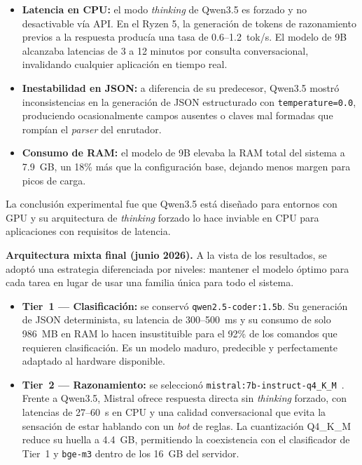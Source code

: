 \begin{itemize}
    \item \textbf{Latencia en CPU:} el modo \textit{thinking} de Qwen3.5 es forzado y no desactivable vía API. En el Ryzen 5, la generación de tokens de razonamiento previos a la respuesta producía una tasa de 0.6--1.2~tok/s. El modelo de 9B alcanzaba latencias de 3 a 12 minutos por consulta conversacional, invalidando cualquier aplicación en tiempo real.
    \item \textbf{Inestabilidad en JSON:} a diferencia de su predecesor, Qwen3.5 mostró inconsistencias en la generación de JSON estructurado con \texttt{temperature=0.0}, produciendo ocasionalmente campos ausentes o claves mal formadas que rompían el \textit{parser} del enrutador.
    \item \textbf{Consumo de RAM:} el modelo de 9B elevaba la RAM total del sistema a 7.9~GB, un 18\% más que la configuración base, dejando menos margen para picos de carga.
\end{itemize}

La conclusión experimental fue que Qwen3.5 está diseñado para entornos con GPU y su arquitectura de \textit{thinking} forzado lo hace inviable en CPU para aplicaciones con requisitos de latencia.

\textbf{Arquitectura mixta final (junio 2026).} A la vista de los resultados, se adoptó una estrategia diferenciada por niveles: mantener el modelo óptimo para cada tarea en lugar de usar una familia única para todo el sistema.

\begin{itemize}
    \item \textbf{Tier~1 --- Clasificación:} se conservó \texttt{qwen2.5-coder:1.5b}. Su generación de JSON determinista, su latencia de 300--500~ms y su consumo de solo 986~MB en RAM lo hacen insustituible para el 92\% de los comandos que requieren clasificación. Es un modelo maduro, predecible y perfectamente adaptado al hardware disponible.
    \item \textbf{Tier~2 --- Razonamiento:} se seleccionó \texttt{mistral:7b-instruct-q4\_K\_M}~\cite{mistral_7b}. Frente a Qwen3.5, Mistral ofrece respuesta directa sin \textit{thinking} forzado, con latencias de 27--60~s en CPU y una calidad conversacional que evita la sensación de estar hablando con un \textit{bot} de reglas. La cuantización Q4\_K\_M reduce su huella a 4.4~GB, permitiendo la coexistencia con el clasificador de Tier~1 y \texttt{bge-m3} dentro de los 16~GB del servidor.
\end{itemize}

